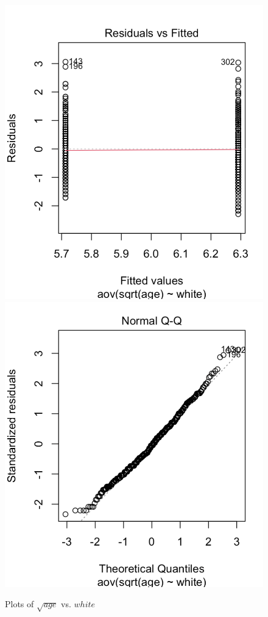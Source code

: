 \begin{figure}[h]
    \includegraphics[scale=.4]{ttest1_transformed_plot1.png}
    \includegraphics[scale=.4]{ttest1_transformed_plot2.png}
    \caption{Plots of $\sqrt{age}$ vs. $white$}
    \label{fig:ttest1_transformed_plots}
\end{figure}

